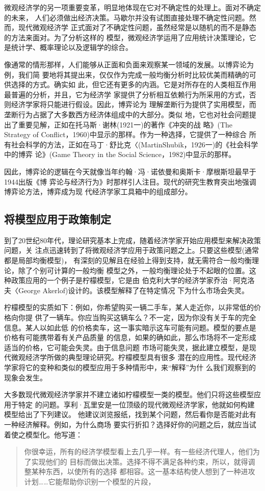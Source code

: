 微观经济学的另一项重要变革，明显地体现在它对不确定性的处理上。面对不确定的未来，
人们必须做出经济决策。马歇尔并没有试图直接处理不确定性问题。然而，现代微观经济学
正式面对了不确定性问题，虽然经常是以随机的而不是静态的方法来面对。为了分析这样的
模型，微观经济学运用了应用统计决策理论，它是统计学、概率理论以及逻辑学的综合。

像通常的情形那样，人们能够从正面和负面来观察某一领域的发展。以博弈论为例，我们简
要地将其提出来，仅仅作为完成一般均衡分析时比较优美而精确的可供选择的方式。确实如
此，但它还有更多的内涵。它是对所存在的人类相互作用最普遍的分析，并且，它为经济学
家提供了分析相互依赖行为所采用的方式，否则经济学家将只能进行假设。因此，博弈论为
理解垄断行为提供了实用模型，而垄断行为占据了大多数西方经济体组成中的大部分。类似
地，它也对社会问题提出了重要见解，正如在托马斯·谢林(1921一)的著作《冲突的战
略》(The Strategy of Conflict，1960)中显示的那样。作为一种选择，它提供了一种综合
所有社会科学的方法，正如在马丁·舒比克〈(MartinShubik，1926一)的《社会科学中的博弈
论》(Game Theory in the Social Science，1982)中显示的那样。

因此，博弈论的逻辑在今天就像当年约翰·冯·诺依曼和奥斯卡·摩根斯坦最早于1944出版《博
弈论与经济行为》时那样引人注目。现代的研究生教育突出地强调博弈论方法，博弈成为现
代经济学家工具箱中的组成部分。

\subsection{将模型应用于政策制定}

到了20世纪80年代，理论研究基本上完成，随着经济学家开始应用模型来解决政策问题，关
注点迅速转到了将微观经济学应用于政策问题之上。只要这些模型(通常都是局部均衡模型)，
有深刻的见解且在经验上得到支持，就无需符合一般均衡理论，除了个别可计算的一般均衡
模型之外，一般均衡理论处于不起眼的位置。这种政策应用的一个例子是柠檬模型，它是由
伯克利大学的经济学家乔治·阿克洛夫〈George Akerlof)设计的。该模型解释了在特定情况
下为什么市场会失灵。

柠檬模型的实质如下：例如，你希望购买一辆二手车，某人走近你，以非常低的价格向你提
供了一辆车。你应当购买这辆车么？不一定，因为你没有关于车的完全信息。某人以如此低
的价格卖车，这一事实暗示这车可能有问题。模型的要点是价格有可能携带着有关产品质量
的信息，如果的确如此，那么市场将不一定形成适当的价格，它可能会失灵。由于信息问题
市场可能失灵，据此建立模型，是现代微观经济学所做的典型理论研究。柠檬模型具有很多
潜在的应用性。现代经济学家将它的变种和类似的模型应用于多种情形中，来“解释”为什
么我们观察到的现象会发生。

大多数现代微观经济学家并不建立诸如柠檬模型一类的模型。他们只将这些模型应用于特定
的问题。享利·瓦里安是一位顶级的现代微观经济学家，他就如何构建模型给出了下列建议。
他建议浏览报纸，找到某个问题，然后看你是否能对此有一种经济解释。例如，为什么商场
要实行折扣？选择好你的问题之后，就应当试着使之模型化。他写道：
\begin{quotation}
  你很幸运，所有的经济学模型看上去几乎一样。有一些经济代理人，他们为了实现他们的
  目标而做出决策。选择不得不满足各种约束，所以，就得调整某种东西，以使所有的选择
  都相容。这一基本结构使人想到了一种进攻计划……它能帮助你识别一个模型的片段，
\end{quotation}

